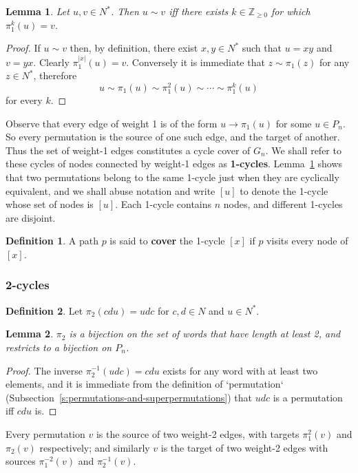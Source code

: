 \documentclass[a4paper]{article}
\newtheorem{lemma}{Lemma}
\theoremstyle{definition}
\newtheorem{defn}{Definition}[section]
\theoremstyle{remark}
\let\definiendum\textbf
\begin{document}
\begin{lemma}\label{lem:pi1-sim}
Let $u, v\in N^*$. Then $u\sim v$ iff there exists $k\in\mathbb{Z}_{\ge 0}$ for which $\pi_1^k(u)=v$.
\end{lemma}
\begin{proof}
If $u\sim v$ then, by definition, there exist $x, y\in N^*$ such that $u=xy$ and $v=yx$. Clearly $\pi_1^{|x|}(u)=v$. Conversely it is immediate that $z\sim\pi_1(z)$ for any $z\in N^*$, therefore
\[
    u \sim \pi_1(u) \sim \pi_1^2(u) \sim\cdots\sim \pi_1^k(u)
\]
for every $k$.
\end{proof}

Observe that every edge of weight 1 is of the form $u\to\pi_1(u)$ for some $u\in P_n$. So every permutation is the source of one such edge, and the target of another. Thus the set of weight-1 edges constitutes a cycle cover of $G_n$. We shall refer to these cycles of nodes connected by weight-1 edges as \definiendum{1-cycles}. Lemma~\ref{lem:pi1-sim} shows that two permutations belong to the same 1-cycle just when they are cyclically equivalent, and we shall abuse notation and write $[u]$ to denote the 1-cycle whose set of nodes is $[u]$. Each 1-cycle contains $n$ nodes, and different 1-cycles are disjoint.

\begin{defn}\label{def:covers}
    A path $p$ is said to \definiendum{cover} the 1-cycle $[x]$ if $p$ visits every node of $[x]$.
\end{defn}

\subsubsection{2-cycles}
\begin{defn}
    Let $\pi_2(cdu) = udc$ for $c, d\in N$ and $u\in N^*$.
\end{defn}
\begin{lemma}
    $\pi_2$ is a bijection on the set of words that have length at least 2, and restricts to a bijection on $P_n$.
\end{lemma}
\begin{proof}
    The inverse $\pi_2^{-1}(udc) = cdu$ exists for any word with at least two elements,
    and it is immediate from the definition of `permutation` (Subsection~\ref{s:permutations-and-superpermutations}) that $udc$ is a permutation iff $cdu$ is.
\end{proof}
Every permutation $v$ is the source of two weight-2 edges, with targets $\pi_1^2(v)$ and $\pi_2(v)$ respectively; and similarly $v$ is the target of two weight-2 edges with sources $\pi_1^{-2}(v)$ and $\pi_2^{-1}(v)$.
\end{document}
